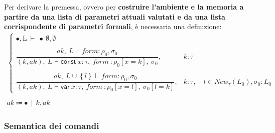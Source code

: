 \documentclass[a4paper]{article}
\begin{document}
	\noindent
	Per derivare la premessa, ovvero per \textbf{costruire l'ambiente e la memoria a partire da una lista di parametri attuali valutati e da una lista corrispondente di parametri formali}, è necessaria una definizione:
	\begin{gather*}
		\begin{cases}
			\bullet, \mathrm{L} \: \vdash \: \bullet \: \emptyset, \emptyset \\
			\\
			\dfrac{
				ak, \: L \vdash form: \rho_{0}, \sigma_{0}
			}{
				\left(k, ak\right), \: L \vdash \textsf{const} \: x:\tau, \: form \: : \rho_{0}\left[x = k\right], \: \sigma_{0}
			}, & k : \tau \\
			\\
			\dfrac{
				ak, \: L \cup \left\{l\right\} \vdash form: \rho_{0}, \sigma_{0}
			}{
				\left(k, ak\right), \: L \vdash \textsf{var} \: x:\tau, \: form \: : \rho_{0}\left[x = l\right], \: \sigma_{0}\left[l = k\right]
			}, & k : \tau, \hspace{1em} l \in New_{\tau}\left(L_{0}\right), \sigma_{0}:L_{0}
		\end{cases} \\
		\\
		ak \Coloneq \bullet \:\: | \:\: k, ak
	\end{gather*}
	
	\subsubsection{Semantica dei comandi}
\end{document}
